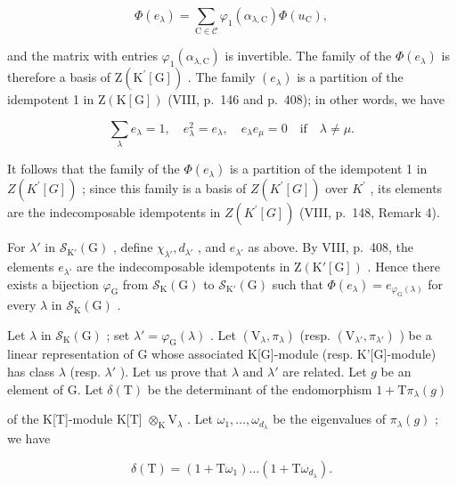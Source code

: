 \[
\Phi (e _ {\lambda}) = \sum_ {\mathrm{C} \in \mathcal {C}} \varphi_ {1} (\alpha_ {\lambda , \mathrm{C}}) \Phi (u _ {\mathrm{C}}),\tag{46}
\]

and the matrix with entries \(\varphi_{1}(\alpha_{\lambda,\mathrm{C}})\) is invertible. The family of the \(\Phi(e_{\lambda})\) is therefore a basis of \(\mathrm{Z}(\mathrm{K}^{\prime}[\mathrm{G}])\) . The family \((e_{\lambda})\) is a partition of the idempotent 1 in \(\mathrm{Z}(\mathrm{K}[\mathrm{G}])\) (VIII, p.~146 and p.~408); in other words, we have

\[
\sum_ {\lambda} e _ {\lambda} = 1, \quad e _ {\lambda} ^ {2} = e _ {\lambda}, \quad e _ {\lambda} e _ {\mu} = 0 \quad \mathrm{if} \quad \lambda \neq \mu .
\]

It follows that the family of the \(\Phi(e_{\lambda})\) is a partition of the idempotent 1 in \(Z(K^{\prime}[G])\) ; since this family is a basis of \(Z(K^{\prime}[G])\) over \(K^{\prime}\) , its elements are the indecomposable idempotents in \(Z(K^{\prime}[G])\) (VIII, p.~148, Remark 4).

For \(\lambda'\) in \(\mathcal{S}_{\mathrm{K}'}(\mathrm{G})\) , define \(\chi_{\lambda'}, d_{\lambda'}\) , and \(e_{\lambda'}\) as above. By VIII, p.~408, the elements \(e_{\lambda'}\) are the indecomposable idempotents in \(\mathrm{Z}(\mathrm{K}'[\mathrm{G}])\) . Hence there exists a bijection \(\varphi_{\mathrm{G}}\) from \(\mathcal{S}_{\mathrm{K}}(\mathrm{G})\) to \(\mathcal{S}_{\mathrm{K}'}(\mathrm{G})\) such that \(\Phi(e_{\lambda}) = e_{\varphi_{\mathrm{G}}(\lambda)}\) for every \(\lambda\) in \(\mathcal{S}_{\mathrm{K}}(\mathrm{G})\) .

Let \(\lambda\) in \(\mathcal{S}_{\mathrm{K}}(\mathrm{G})\) ; set \(\lambda' = \varphi_{\mathrm{G}}(\lambda)\) . Let \((\mathrm{V}_{\lambda}, \pi_{\lambda})\) (resp. \((\mathrm{V}_{\lambda'}, \pi_{\lambda'})\) ) be a linear representation of G whose associated K{[}G{]}-module (resp. K'{[}G{]}-module) has class \(\lambda\) (resp. \(\lambda'\) ). Let us prove that \(\lambda\) and \(\lambda'\) are related. Let \(g\) be an element of G. Let \(\delta(\mathrm{T})\) be the determinant of the endomorphism \(1 + \mathrm{T}\pi_{\lambda}(g)\)

of the K{[}T{]}-module K{[}T{]} \(\otimes_{\mathrm{K}}\mathrm{V}_{\lambda}\) . Let \(\omega_{1},\ldots ,\omega_{d_{\lambda}}\) be the eigenvalues of \(\pi_{\lambda}(g)\) ; we have

\[
\delta (\mathrm{T}) = (1 + \mathrm{T} \omega_ {1}) \dots (1 + \mathrm{T} \omega_ {d _ {\lambda}}).
\]

